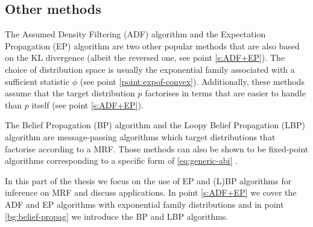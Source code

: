 \subsection{Other methods}

The Assumed Density Filtering (ADF) algorithm and the  Expectation Propagation (EP) algorithm are two other popular methods that are also based on the KL divergence (albeit the reversed one, see point \ref{s:ADF+EP}).
The choice of distribution space is usually the exponential family associated with a sufficient statistic $\phi$ (see point \ref{point:expof-convex}). Additionally, these methods assume that the target distribution $p$ factorises in terms that are easier to handle than $p$ itself (see point \ref{s:ADF+EP}).

The Belief Propagation (BP) algorithm and the Loopy Belief Propagation (LBP) algorithm are message-passing algorithms which target distributions that factorise according to a MRF. Those methods can also be shown to be fixed-point algorithms corresponding to a specific form of \eqref{eq:generic-abi} \citep{yedidia01, yedidia02}.

In this part of the thesis we focus on the use of EP and (L)BP algorithms for inference on MRF and discuss applications. In point \ref{s:ADF+EP} we cover the ADF and EP algorithms with exponential family distributions and in point \ref{bg:belief-propag} we introduce the BP and LBP algorithms.





